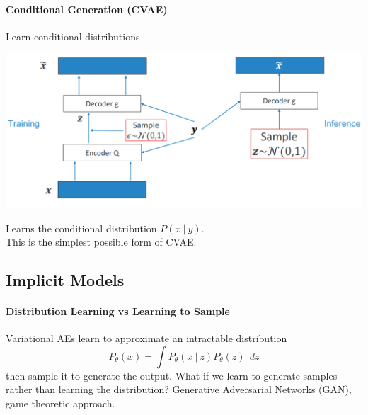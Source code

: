 \documentclass[10pt]{report}
\begin{document}
\paragraph{Conditional Generation (CVAE)} Learn conditional distributions\begin{center}
	\includegraphics[scale=0.5]{146.png}
\end{center}
Learns the conditional distribution $P(x\:|\:y)$.\\
This is the simplest possible form of CVAE.
\subsection{Implicit Models}
\paragraph{Distribution Learning vs Learning to Sample} Variational AEs  learn to approximate an intractable distribution
$$P_\theta(x) = \int P_\theta(x\:|\:z)P_\theta(z)\:\:dz$$
then sample it to generate the output. What if we learn to generate samples rather than learning the distribution? Generative Adversarial Networks (GAN), game theoretic approach.
\end{document}
